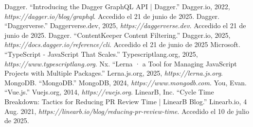 \begin{thebibliography}{99}
 Dagger. ``Introducing the Dagger GraphQL API | Dagger.'' Dagger.io, 2022, {\it https://dagger.io/blog/graphql}. Accedido el 21 de junio de 2025.
 Dagger. ``Daggerverse.'' Daggerverse.dev, 2025, {\it https://daggerverse.dev}. Accedido el 21 de junio de 2025.
 Dagger. ``ContentKeeper Content Filtering.'' Dagger.io, 2025, {\it https://docs.dagger.io/reference/cli}. Accedido el 21 de junio de 2025
 Microsoft. ``TypeScript - JavaScript That Scales.'' Typescriptlang.org, 2025, {\it https://www.typescriptlang.org}.
 Nx. ``Lerna · a Tool for Managing JavaScript Projects with Multiple Packages.'' Lerna.js.org, 2025, {\it https://lerna.js.org}.
 MongoDB. ``MongoDB.'' MongoDB, 2024, {\it https://www.mongodb.com}.
 You, Evan. ``Vue.js.'' Vuejs.org, 2014, {\it https://vuejs.org}.
 LinearB, Inc. ``Cycle Time Breakdown: Tactics for Reducing PR Review Time | LinearB Blog.'' Linearb.io, 4 Aug. 2021, {\it https://linearb.io/blog/reducing-pr-review-time}. Accedido el 10 de julio de 2025.

\end{thebibliography}

